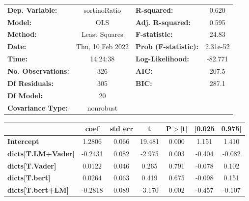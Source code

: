 \begin{center}
\begin{tabular}{lclc}
\toprule
\textbf{Dep. Variable:}              &   sortinoRatio   & \textbf{  R-squared:         } &     0.620   \\
\textbf{Model:}                      &       OLS        & \textbf{  Adj. R-squared:    } &     0.595   \\
\textbf{Method:}                     &  Least Squares   & \textbf{  F-statistic:       } &     24.83   \\
\textbf{Date:}                       & Thu, 10 Feb 2022 & \textbf{  Prob (F-statistic):} &  2.31e-52   \\
\textbf{Time:}                       &     14:24:38     & \textbf{  Log-Likelihood:    } &   -82.771   \\
\textbf{No. Observations:}           &         326      & \textbf{  AIC:               } &     207.5   \\
\textbf{Df Residuals:}               &         305      & \textbf{  BIC:               } &     287.1   \\
\textbf{Df Model:}                   &          20      & \textbf{                     } &             \\
\textbf{Covariance Type:}            &    nonrobust     & \textbf{                     } &             \\
\bottomrule
\end{tabular}
\begin{tabular}{lcccccc}
                                     & \textbf{coef} & \textbf{std err} & \textbf{t} & \textbf{P$> |$t$|$} & \textbf{[0.025} & \textbf{0.975]}  \\
\midrule
\textbf{Intercept}                   &       1.2806  &        0.066     &    19.481  &         0.000        &        1.151    &        1.410     \\
\textbf{dicts[T.LM+Vader]}           &      -0.2431  &        0.082     &    -2.975  &         0.003        &       -0.404    &       -0.082     \\
\textbf{dicts[T.Vader]}              &       0.0122  &        0.046     &     0.265  &         0.791        &       -0.078    &        0.102     \\
\textbf{dicts[T.bert]}               &       0.0264  &        0.063     &     0.419  &         0.675        &       -0.098    &        0.151     \\
\textbf{dicts[T.bert+LM]}            &      -0.2818  &        0.089     &    -3.170  &         0.002        &       -0.457    &       -0.107     \\

\end{tabular}
\end{center}
